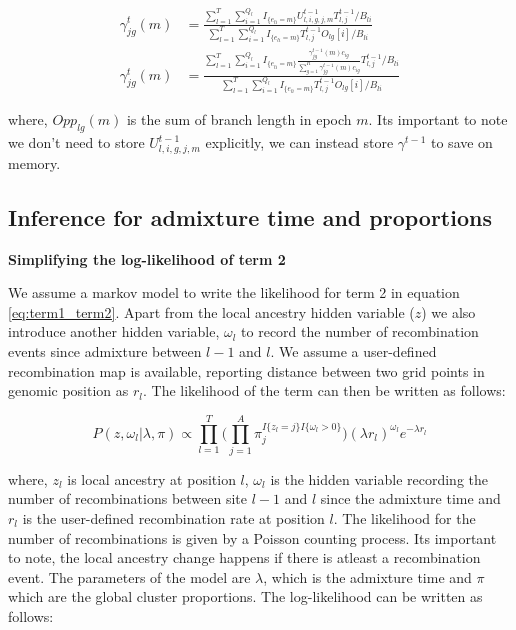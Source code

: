 \begin{align}
    \gamma_{jg}^{t}(m) &= \frac{\sum_{l = 1}^T \sum_{i = 1}^{Q_l}  I_{\{e_{l i} = m\}} U_{l,i,g,j,m}^{t-1} T_{l,j}^{t-1}/B_{li}}{\sum_{l = 1}^T \sum_{i = 1}^{Q_l}  I_{\{e_{l i} = m\}} T_{l,j}^{t-1}  O_{lg}[i]/B_{li} } \nonumber \\
    \gamma_{jg}^{t}(m) &= \frac{\sum_{l = 1}^T \sum_{i = 1}^{Q_l}  I_{\{e_{l i} = m\}} \frac{\gamma_{jg}^{t-1}(m)c_{ig}}{\sum_{g=1}^R \gamma_{jg}^{t-1}(m)c_{ig}} T_{l,j}^{t-1}/B_{li}}{\sum_{l = 1}^T \sum_{i = 1}^{Q_l}  I_{\{e_{l i} = m\}} T_{l,j}^{t-1}  O_{lg}[i]/B_{li} }
\label{eq:gamma_update}
\end{align}

\vspace{1mm}
where, $Opp_{lg}(m)$ is the sum of branch length in epoch $m$. Its important to note we don't need to store $U_{l,i,g,j,m}^{t-1}$ explicitly, we can instead store $\gamma^{t-1}$ to save on memory.

\subsection{Inference for admixture time and proportions}
\textbf{Simplifying the log-likelihood of term 2} 

We assume a markov model to write the likelihood for term 2 in equation \ref{eq:term1_term2}. Apart from the local ancestry hidden variable ($z$) we also introduce another hidden variable, $\omega_l$ to record the number of recombination events since admixture between $l-1$ and $l$. We assume a user-defined recombination map is available, reporting distance between two grid points in genomic position as $r_l$. The likelihood of the term can then be written as follows:

\begin{equation}
    P(z, \omega_l \vert \lambda, \pi) \propto \prod\limits_{l=1}^{T} \Big( \prod\limits_{j=1}^{A} \pi_j ^ {I\{z_l = j\} I\{\omega_l > 0\}} \Big) (\lambda r_l)^{\omega_l} e^{-\lambda r_l}
\end{equation}

where, $z_l$ is local ancestry at position $l$, $\omega_l$ is the hidden variable recording the number of recombinations between site $l-1$ and $l$ since the admixture time and $r_l$ is the user-defined recombination rate at position $l$. The likelihood for the number of recombinations is given by a Poisson counting process. Its important to note, the local ancestry change happens if there is atleast a recombination event. The parameters of the model are $\lambda$, which is the admixture time and $\pi$ which are the global cluster proportions. The log-likelihood can be written as follows:

